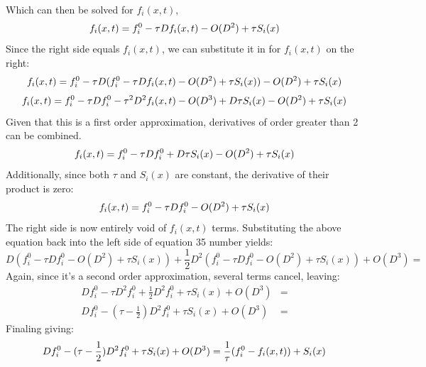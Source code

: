 \documentclass[12pt,a4paper]{article}
\begin{document}
Which can then be solved for $f_i(x,t)$,
\begin{equation}
f_i(x,t) = f_i^0 - \tau Df_i(x,t) - O(D^2)  + \tau S_i(x)\\
\end{equation}
Since the right side equals $f_i(x,t)$, we can substitute it in for $f_i(x,t)$ on the right:
\begin{equation}
f_i(x,t) = f_i^0 - \tau D(f_i^0 - \tau Df_i(x,t) - O(D^2)  + \tau S_i(x)) - O(D^2)  + \tau S_i(x)\\
\end{equation}
\begin{equation}
f_i(x,t) = f_i^0 - \tau Df_i^0 - \tau^2 D^2f_i(x,t) - O(D^3)  + D\tau S_i(x) - O(D^2)  + \tau S_i(x)\\
\end{equation}
Given that this is a first order approximation, derivatives of order greater than 2 can be combined.
\begin{equation}
f_i(x,t) = f_i^0 - \tau Df_i^0  + D\tau S_i(x) - O(D^2)  + \tau S_i(x)\\
\end{equation}
Additionally, since both $\tau$ and $S_i(x)$ are constant, the derivative of their product is zero:
\begin{equation}
f_i(x,t) = f_i^0 - \tau Df_i^0 - O(D^2)  + \tau S_i(x)\\
\end{equation}
The right side is now entirely void of $f_i(x,t)$ terms. Substituting the above equation back into the left side of equation 35 number yields:
\begin{equation}
D(f_i^0 - \tau Df_i^0 - O(D^2)  + \tau S_i(x)) + \frac{1}{2}D^2(f_i^0 - \tau Df_i^0 - O(D^2)  + \tau S_i(x)) + O(D^3) =
\end{equation}
Again, since it's a second order approximation, several terms cancel, leaving:
\begin{align}
Df_i^0 - \tau D^2f_i^0 + \frac{1}{2}D^2f_i^0  + \tau S_i(x) + O(D^3) &= \\
Df_i^0 - (\tau - \frac{1}{2})D^2f_i^0  + \tau S_i(x) + O(D^3) &= 
\end{align}
Finaling giving:
\begin{equation}
Df_i^0 - (\tau - \frac{1}{2})D^2f_i^0  + \tau S_i(x) + O(D^3) = \frac{1}{\tau}(f_i^0-f_i(x,t)) + S_i(x)\\
\end{equation}
\end{document}
